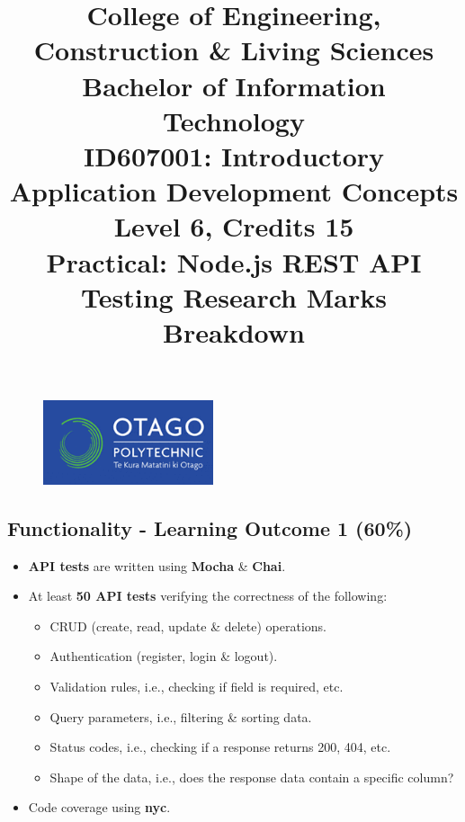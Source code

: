 \documentclass{article}
\author{}
\begin{document}
\begin{figure}
  \centering
  \includegraphics[width=50mm]{../img/logo.png}
\end{figure}

\title{College of Engineering, Construction \& Living Sciences\\Bachelor of Information Technology\\ID607001: Introductory Application Development Concepts\\Level 6, Credits 15\\\textbf{Practical: Node.js REST API Testing Research Marks Breakdown}}
\date{}
\maketitle

\subsection*{Functionality - Learning Outcome 1 (60\%)}
\begin{itemize}
  \item \textbf{API tests} are written using \textbf{Mocha} \& \textbf{Chai}.
  \item At least \textbf{50 API tests} verifying the correctness of the following:
        \begin{itemize}
          \item CRUD (create, read, update \& delete) operations.
          \item Authentication (register, login \& logout).
          \item Validation rules, i.e., checking if field is required, etc.
          \item Query parameters, i.e., filtering \& sorting data.
          \item Status codes, i.e., checking if a response returns 200, 404, etc.
          \item Shape of the data, i.e., does the response data contain a specific column?
        \end{itemize}
  \item Code coverage using \textbf{nyc}.
\end{itemize}
\end{document}
